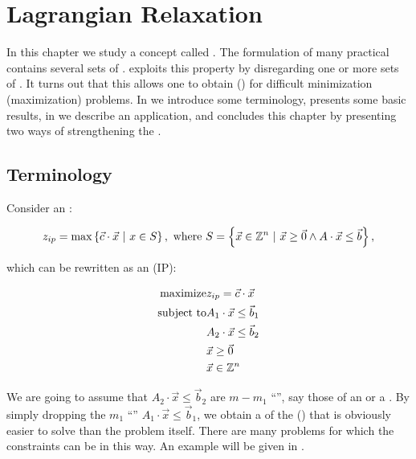 \chapter{Lagrangian Relaxation}
In this chapter we study a concept called . The formulation of many practical  contains several sets of .  exploits this property by disregarding one or more sets of . It turns out that this  allows one to obtain  () for difficult minimization (maximization) problems. In  we introduce some terminology,  presents some basic results, in  we describe an application, and  concludes this chapter by presenting two ways of strengthening the .

\section{Terminology}

Consider an :

\begin{equation}
z_{ip}=\max\left\{ \vec{c}\cdot\vec{x}\ |\ x\in S \right\},\mbox{ where }S=\left\{ \vec{x}\in\mathbb{Z}^n\ |\ \vec{x}\geq\vec{0}\wedge A\cdot\vec{x}\leq\vec{b} \right\},
\end{equation}

which can be rewritten as an  (IP):

\begin{eqnarray}
\mbox{maximize}&z_{ip}=\vec{c}\cdot\vec{x}\eqnlab{lagragea-m}\\
\mbox{subject to}&A_1\cdot\vec{x}\leq\vec{b}_1\eqnlab{lagragea-c1}\\
&A_2\cdot\vec{x}\leq\vec{b}_2\eqnlab{lagragea-c2}\\
&\vec{x}\geq\vec{0}\eqnlab{lagragea-c3}\\
&\vec{x}\in\ZZZ^n\eqnlab{lagragea-c4}
\end{eqnarray}

We are going to assume that $A_2\cdot\vec{x}\leq\vec{b}_2$ are $m-m_1$ ``'', say those of an  or a . By simply dropping the $m_1$ ``'' $A_1\cdot\vec{x}\leq\vec{b}_1$, we obtain a  of the  () that is obviously easier to solve than the problem itself. There are many problems for which the constraints can be  in this way. An example will be given in .

